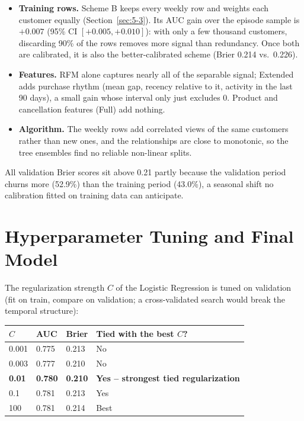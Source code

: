 \begin{itemize}
    \item \textbf{Training rows.} Scheme B keeps every weekly row and weights each customer equally (Section~\ref{sec:5-3}). Its AUC gain over the episode sample is $+0.007$ (95\% CI $[+0.005, +0.010]$): with only a few thousand customers, discarding 90\% of the rows removes more signal than redundancy. Once both are calibrated, it is also the better-calibrated scheme (Brier 0.214 vs.\ 0.226).
    \item \textbf{Features.} RFM alone captures nearly all of the separable signal; Extended adds purchase rhythm (mean gap, recency relative to it, activity in the last 90 days), a small gain whose interval only just excludes 0. Product and cancellation features (Full) add nothing.
    \item \textbf{Algorithm.} The weekly rows add correlated views of the same customers rather than new ones, and the relationships are close to monotonic, so the tree ensembles find no reliable non-linear splits.
\end{itemize}

All validation Brier scores sit above 0.21 partly because the validation period churns more (52.9\%) than the training period (43.0\%), a seasonal shift no calibration fitted on training data can anticipate.

\section{Hyperparameter Tuning and Final Model}
\label{sec:6-final}

The regularization strength $C$ of the Logistic Regression is tuned on validation (fit on train, compare on validation; a cross-validated search would break the temporal structure):

\begin{center}
\begin{tabular}{@{}p{1.8cm}p{1.8cm}p{1.8cm}p{6cm}@{}}
    \toprule
    $C$ & AUC & Brier & Tied with the best $C$? \\
    \midrule
    0.001 & 0.775 & 0.213 & No \\
    0.003 & 0.777 & 0.210 & No \\
    \textbf{0.01} & \textbf{0.780} & \textbf{0.210} & \textbf{Yes -- strongest tied regularization} \\
    0.1 & 0.781 & 0.213 & Yes \\
    100 & 0.781 & 0.214 & Best \\
    \bottomrule
\end{tabular}
\end{center}

